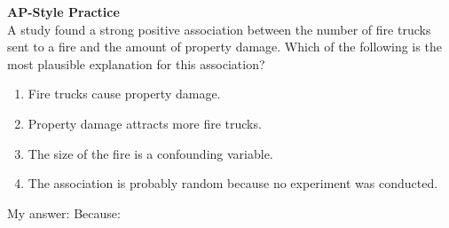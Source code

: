 \documentclass[10pt]{article}
\begin{document}
\begin{tcolorbox}[colback=redbg, colframe=redacc, boxrule=0.8pt, arc=2mm,
    left=4mm, right=4mm, top=3mm, bottom=3mm]
\small\textbf{AP-Style Practice}\\[6pt]
A study found a strong positive association between the number of fire trucks sent to
a fire and the amount of property damage. Which of the following is the most plausible
explanation for this association?

\vspace{10pt}
\begin{enumerate}[label=\textbf{(\Alph*)}, leftmargin=2em, itemsep=6pt]
  \item Fire trucks cause property damage.
  \item Property damage attracts more fire trucks.
  \item The size of the fire is a confounding variable.
  \item The association is probably random because no experiment was conducted.
\end{enumerate}
\end{tcolorbox}

\vspace{0.12in}
\noindent\textcolor{slate}{\small My answer: \blank{1cm} \quad Because: \blank{8.5cm}}
\end{document}
